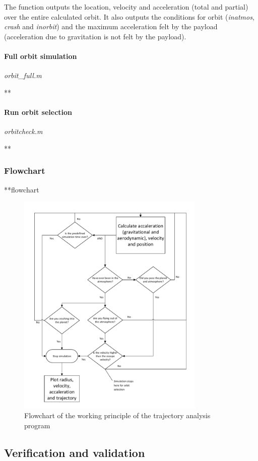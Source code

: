 The function outputs the location, velocity and acceleration (total and partial) over the entire calculated orbit. It also outputs the conditions for orbit (\textit{inatmos}, \textit{crash} and \textit{inorbit}) and the maximum acceleration felt by the payload (acceleration due to gravitation is not felt by the payload).

\paragraph{Full orbit simulation} \textit{orbit\_full.m}

**

\paragraph{Run orbit selection} \textit{orbitcheck.m}

**

\subsubsection{Flowchart} \label{subsec:flow}
**flowchart

\begin{figure}[H]
\centering
\hspace{-23mm}
\includegraphics[width = 0.8\textwidth]{Figure/astro_tool.pdf}
\vspace{-5mm}
\caption{Flowchart of the working principle of the trajectory analysis program}
\label{fig:traj_flow}
\end{figure}

\subsection{Verification and validation}